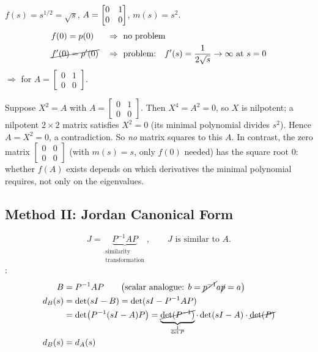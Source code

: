 \begin{example}
$f(s) = s^{1/2} = \sqrt{s}$, \qquad $A = \begin{bmatrix}0&1\\0&0\end{bmatrix}$, \qquad $m(s) = s^2$.
\begin{align*}
&f(0) = p(0) && \Rightarrow\ \text{no problem}\\
&\cancel{f'(0) = p'(0)} && \Rightarrow\ \text{problem:}\quad
f'(s) = \frac{1}{2\sqrt s} \to \infty \text{ at } s = 0
\end{align*}
$\Rightarrow$  for $A=\left[\begin{smallmatrix}0&1\\0&0\end{smallmatrix}\right]$.
\begin{insight}
Suppose $X^2=A$ with $A=\left[\begin{smallmatrix}0&1\\0&0\end{smallmatrix}\right]$. Then $X^4=A^2=0$, so $X$ is nilpotent; a nilpotent $2\times2$ matrix satisfies $X^2=0$ (its minimal polynomial divides $s^2$). Hence $A=X^2=0$, a contradiction. So \emph{no} matrix squares to this $A$. In contrast, the zero matrix $\left[\begin{smallmatrix}0&0\\0&0\end{smallmatrix}\right]$ (with $m(s)=s$, only $f(0)$ needed) has the square root $0$: whether $f(A)$ exists depends on which derivatives the minimal polynomial requires, not only on the eigenvalues.
\end{insight}
\end{example}

\subsection{Method II: Jordan Canonical Form}\label{ss:method2}
%
\[
J = \underbrace{P^{-1}AP}_{\substack{\text{similarity}\\ \text{transformation}}},
\qquad J \text{ is similar to } A.
\]
:
\begin{align*}
B &= P^{-1}AP \qquad \bigl(\text{scalar analogue: } b = \cancel{p^{-1}}a\cancel{p} = a\bigr)\\
d_B(s) &= \det(sI-B) = \det(sI - P^{-1}AP)\\
&= \det\bigl(P^{-1}(sI-A)P\bigr) = \underbrace{\cancel{\det(P^{-1})}}_{\frac{1}{\det P}}\cdot\det(sI-A)\cdot\cancel{\det(P)}\\
d_B(s) &= d_A(s)
\end{align*}

